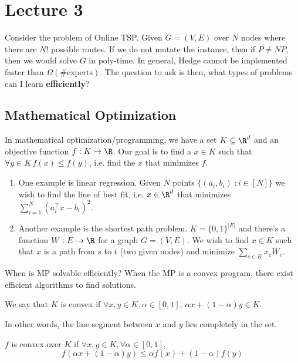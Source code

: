 \section{Lecture 3}
Consider the problem of Online TSP. Given $G = (V, E)$ over $N$ nodes
where there are $N!$ possible routes. If we do not mutate the instance,
then if $P \neq NP$, then we would solve $G$ in poly-time.
In general, Hedge cannot be implemented faster than $\Omega(\text{\# experts})$.
The question to ask is then, what types of problems can I learn \textbf{efficiently}?

\subsection{Mathematical Optimization}
In mathematical optimization/programming, we have a set $K \subseteq \R^d$ and an objective function
$f: K \to \R$. Our goal is to find a $x \in K$ such that $\forall y \in K \, f(x) \le f(y)$, i.e.
find the $x$ that minimizes $f$.

\begin{example}
    \begin{enumerate}
        \item One example is linear regression. Given $N$ points
        $ \{ (a_i, b_i) \; : i \in [N] \}$ we wish to find the line of
        best fit, i.e. $x \in \R^d$ that minimizes $\sum_{i = 1}^{N} (a_i^{\top} x - b_i)^2$.
        \item Another example is the shortest path problem. $K = \{0, 1\}^{|E|}$
        and there's a function $W: E \to \R$ for a graph $G = (V, E)$.
        We wish to find $x \in K$ such that $x$ is a path from $s$ to $t$ (two given nodes)
        and minimize $\sum_{e \in K} x_e W_e$.
    \end{enumerate}
\end{example}

When is MP solvable efficiently? When the MP is a convex program, there exist efficient algorithms
to find solutions.

\begin{definition}
    We say that $K$ is convex if $\forall x, y \in K, \alpha \in [0, 1]$, $\alpha x + (1 - \alpha)y \in K$.
\end{definition}
In other words, the line segment between $x$ and $y$ lies completely in the set.

\begin{definition}
    $f$ is convex over $K$ if $\forall x, y \in K, \forall \alpha \in [0, 1]$,
    \[ f(\alpha x + (1 - \alpha) y) \le \alpha f(x) + (1 - \alpha) f(y) \]
\end{definition}

